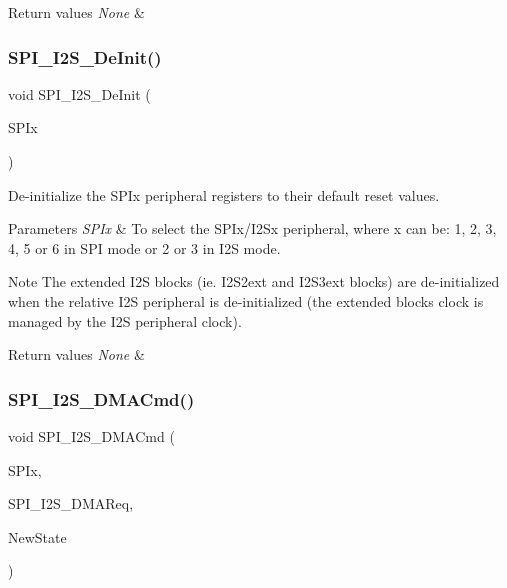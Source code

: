 \begin{DoxyRetVals}{Return values}
{\em None} & \\
\hline
\end{DoxyRetVals}
\mbox{\label{group___s_p_i_gabe36880945fa56785283a9c0092124cc}} 
\subsubsection{\texorpdfstring{S\+P\+I\+\_\+\+I2\+S\+\_\+\+De\+Init()}{SPI\_I2S\_DeInit()}}
{\footnotesize\ttfamily void S\+P\+I\+\_\+\+I2\+S\+\_\+\+De\+Init (\begin{DoxyParamCaption}\item[{S\+P\+I\+\_\+\+Type\+Def $\ast$}]{S\+P\+Ix }\end{DoxyParamCaption})}



De-\/initialize the S\+P\+Ix peripheral registers to their default reset values. 


\begin{DoxyParams}{Parameters}
{\em S\+P\+Ix} & To select the S\+P\+Ix/\+I2\+Sx peripheral, where x can be\+: 1, 2, 3, 4, 5 or 6 in S\+PI mode or 2 or 3 in I2S mode. ~\newline
 \\
\hline
\end{DoxyParams}
\begin{DoxyNote}{Note}
The extended I2S blocks (ie. I2\+S2ext and I2\+S3ext blocks) are de-\/initialized when the relative I2S peripheral is de-\/initialized (the extended block\textquotesingle{}s clock is managed by the I2S peripheral clock).
\end{DoxyNote}

\begin{DoxyRetVals}{Return values}
{\em None} & \\
\hline
\end{DoxyRetVals}
\mbox{\label{group___s_p_i_gabed5b91a8576e6d578f364cc0e807e4a}} 
\subsubsection{\texorpdfstring{S\+P\+I\+\_\+\+I2\+S\+\_\+\+D\+M\+A\+Cmd()}{SPI\_I2S\_DMACmd()}}
{\footnotesize\ttfamily void S\+P\+I\+\_\+\+I2\+S\+\_\+\+D\+M\+A\+Cmd (\begin{DoxyParamCaption}\item[{S\+P\+I\+\_\+\+Type\+Def $\ast$}]{S\+P\+Ix,  }\item[{uint16\+\_\+t}]{S\+P\+I\+\_\+\+I2\+S\+\_\+\+D\+M\+A\+Req,  }\item[{Functional\+State}]{New\+State }\end{DoxyParamCaption})}



